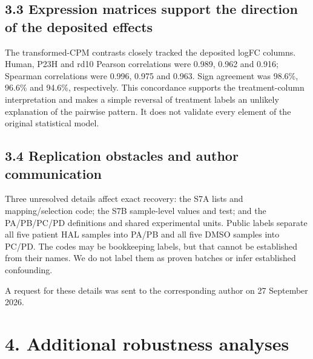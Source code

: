 \documentclass[a4paper,10pt]{article}
\begin{document}
\subsection*{3.3 Expression matrices support the direction of the deposited effects}
The transformed-CPM contrasts closely tracked the deposited logFC columns. Human, P23H and rd10 Pearson correlations were 0.989, 0.962 and 0.916; Spearman correlations were 0.996, 0.975 and 0.963. Sign agreement was 98.6\%, 96.6\% and 94.6\%, respectively. This concordance supports the treatment-column interpretation and makes a simple reversal of treatment labels an unlikely explanation of the pairwise pattern. It does not validate every element of the original statistical model.

\subsection*{3.4 Replication obstacles and author communication}
Three unresolved details affect exact recovery: the S7A lists and mapping/selection code; the S7B sample-level values and test; and the PA/PB/PC/PD definitions and shared experimental units. Public labels separate all five patient HAL samples into PA/PB and all five DMSO samples into PC/PD. The codes may be bookkeeping labels, but that cannot be established from their names. We do not label them as proven batches or infer established confounding.

A request for these details was sent to the corresponding author on 27 September 2026.

\section*{4. Additional robustness analyses}
\end{document}
